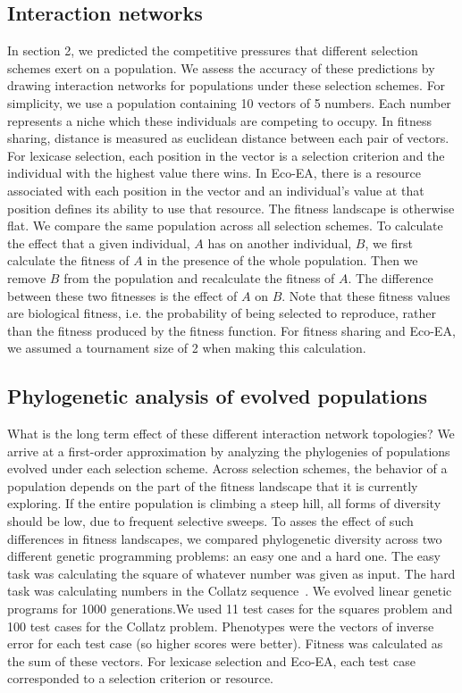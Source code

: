 \subsection{Interaction networks}
In section 2, we predicted the competitive pressures that different selection schemes exert on a population. We assess the accuracy of these predictions by drawing interaction networks for populations under these selection schemes. For simplicity, we use a population containing 10 vectors of 5 numbers. Each number represents a niche which these individuals are competing to occupy. In fitness sharing, distance is measured as euclidean distance between each pair of vectors. For lexicase selection, each position in the vector is a selection criterion and the individual with the highest value there wins. In Eco-EA, there is a resource associated with each position in the vector and an individual's value at that position defines its ability to use that resource. The fitness landscape is otherwise flat. We compare the same population across all selection schemes. To calculate the effect that a given individual, $A$ has on another individual, $B$, we first calculate the fitness of $A$ in the presence of the whole population. Then we remove $B$ from the population and recalculate the fitness of $A$. The difference between these two fitnesses is the effect of $A$ on $B$. Note that these fitness values are biological fitness, i.e. the probability of being selected to reproduce, rather than the fitness produced by the fitness function.  For fitness sharing and Eco-EA, we assumed a tournament size of 2 when making this calculation.

\subsection{Phylogenetic analysis of evolved populations}
What is the long term effect of these different interaction network topologies? We arrive at a first-order approximation by analyzing the phylogenies of populations evolved under each selection scheme. Across selection schemes, the behavior of a population depends on the part of the fitness landscape that it is currently exploring. If the entire population is climbing a steep hill, all forms of diversity should be low, due to frequent selective sweeps. To asses the effect of such differences in fitness landscapes, we compared phylogenetic diversity across two different genetic programming problems: an easy one and a hard one. The easy task was calculating the square of whatever number was given as input. The hard task was calculating numbers in the Collatz sequence~\cite{helmuth_general_2015}. We evolved linear genetic programs for 1000 generations.We used 11 test cases for the squares problem and 100 test cases for the Collatz problem. Phenotypes were the vectors of inverse error for each test case (so higher scores were better). Fitness was calculated as the sum of these vectors. For lexicase selection and Eco-EA, each test case corresponded to a selection criterion or resource. 

